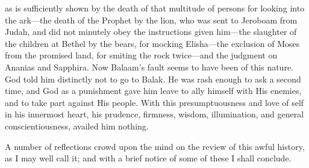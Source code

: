 as is sufficiently shown by the death of that multitude of persons for
looking into the ark—the death of the Prophet by the lion, who was
sent to Jeroboam from Judah, and did not minutely obey the
instructions given him—the slaughter of the children at Bethel by
the bears, for mocking Elisha—the exclusion of Moses from the
promised land, for smiting the rock twice—and the judgment on
Ananias and Sapphira. Now Balaam's fault seems to have been of this
nature. God told him distinctly not to go to Balak. He was rash enough
to ask a second time, and God as a punishment gave him leave to ally
himself with His enemies, and to take part against His people. With
this presumptuousness and love of self in his innermost heart, his
prudence, firmness, wisdom, illumination, and general
conscientiousness, availed him nothing.

A number of reflections crowd upon the mind on the review of this
awful history, as I may well call it; and with a brief notice of some
of these I shall conclude.

